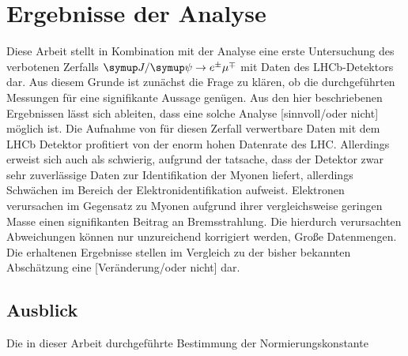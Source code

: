 \chapter{Ergebnisse der Analyse}
\label{chap:5}
%
Diese Arbeit stellt in Kombination mit der Analyse \cite{ba-maik} eine erste Untersuchung des verbotenen Zerfalls $\signal$ mit
Daten des LHCb-Detektors dar. Aus diesem Grunde ist zunächst die Frage zu klären, ob die durchgeführten Messungen für eine signifikante
Aussage genügen. Aus den hier beschriebenen Ergebnissen lässt sich ableiten, dass eine solche Analyse [sinnvoll/oder nicht] möglich ist.
Die Aufnahme von für diesen Zerfall verwertbare Daten mit dem LHCb Detektor profitiert von der enorm hohen Datenrate des LHC. Allerdings
erweist sich auch als schwierig, aufgrund der tatsache, dass der Detektor zwar sehr zuverlässige Daten zur Identifikation der Myonen liefert,
allerdings Schwächen im Bereich der Elektronidentifikation aufweist. Elektronen verursachen im Gegensatz zu Myonen aufgrund ihrer vergleichsweise
geringen Masse einen signifikanten Beitrag an Bremsstrahlung. Die hierdurch verursachten Abweichungen können nur unzureichend korrigiert werden,
Große Datenmengen.
Die erhaltenen Ergebnisse stellen im Vergleich zu der bisher bekannten Abschätzung eine [Veränderung/oder nicht] dar.

\section{Ausblick}
%
Die in dieser Arbeit durchgeführte Bestimmung der Normierungskonstante

